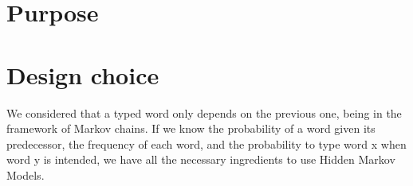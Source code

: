 \section{Purpose}

\section{Design choice}
We considered that a typed word only depends on the previous one, being 
in the framework of Markov chains. If we know the probability of a word 
given its predecessor, the frequency of each word, and the probability to 
type word x when word y is intended, we have all the necessary ingredients 
to use Hidden Markov Models.

